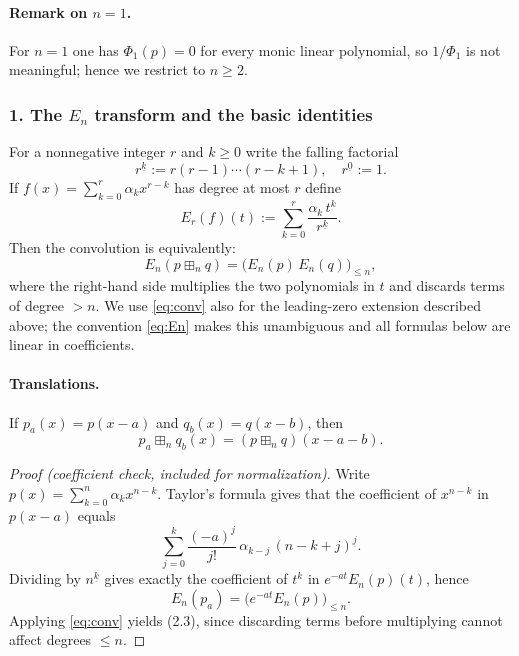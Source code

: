 \documentclass{article}
\begin{document}
\paragraph{Remark on $n=1$.}
For $n=1$ one has $\Phi_1(p) = 0$ for every monic linear polynomial, so $1/\Phi_1$ is not meaningful; hence we restrict to $n \ge 2$.

\subsubsection*{1. The $E_n$ transform and the basic identities}

For a nonnegative integer $r$ and $k \ge 0$ write the falling factorial
\[
  r^{\underline{k}} := r(r-1)\cdots(r-k+1), \quad r^{\underline{0}} := 1.
\]
If $f(x) = \sum_{k=0}^r \alpha_k x^{r-k}$ has degree at most $r$ define
\begin{equation}\label{eq:En}
  E_r(f)(t) := \sum_{k=0}^{r} \frac{\alpha_k\, t^k}{r^{\underline{k}}}. \tag{2.1}
\end{equation}
Then the convolution is equivalently:
\begin{equation}\label{eq:conv}
  E_n(p \boxplus_n q) = \bigl(E_n(p)\,E_n(q)\bigr)_{\le n}, \tag{2.2}
\end{equation}
where the right-hand side multiplies the two polynomials in $t$ and discards terms of degree $> n$.
We use \eqref{eq:conv} also for the leading-zero extension described above; the convention \eqref{eq:En} makes this unambiguous and all formulas below are linear in coefficients.

\paragraph{Translations.}
If $p_a(x) = p(x-a)$ and $q_b(x) = q(x-b)$, then
\begin{equation}
  p_a \boxplus_n q_b(x) = (p \boxplus_n q)(x - a - b). \tag{2.3}
\end{equation}

\begin{proof}[Proof (coefficient check, included for normalization)]
Write $p(x) = \sum_{k=0}^n \alpha_k x^{n-k}$. Taylor's formula gives that the coefficient of $x^{n-k}$ in $p(x-a)$ equals
\[
  \sum_{j=0}^k \frac{(-a)^j}{j!}\,\alpha_{k-j}\,(n-k+j)^{\underline{j}}.
\]
Dividing by $n^{\underline{k}}$ gives exactly the coefficient of $t^k$ in $e^{-at}E_n(p)(t)$, hence
\[
  E_n(p_a) = \bigl(e^{-at} E_n(p)\bigr)_{\le n}.
\]
Applying \eqref{eq:conv} yields (2.3), since discarding terms before multiplying cannot affect degrees $\le n$.
\end{proof}
\end{document}
